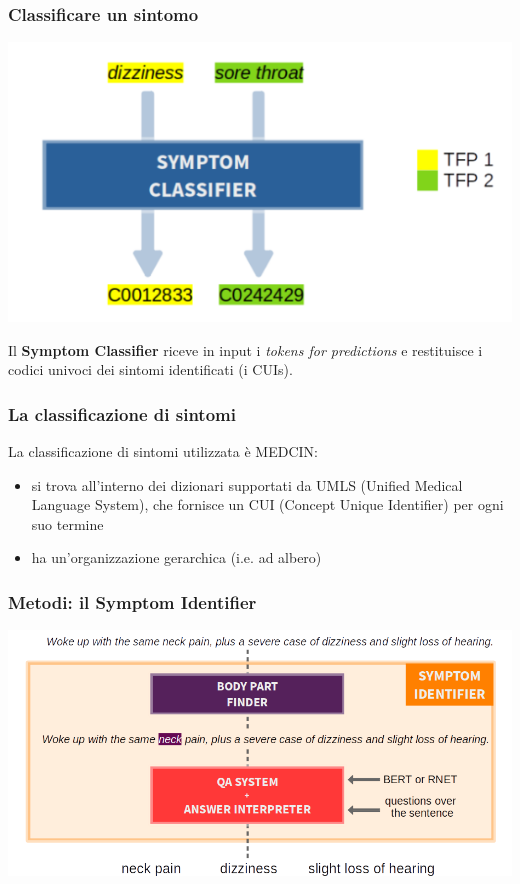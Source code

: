 \documentclass{beamer}
\begin{document}
\begin{frame}
\frametitle{Classificare un sintomo}

\includegraphics[width=\textwidth]{images/symptom_classifier1.png}

Il \textbf{Symptom Classifier} riceve in input i \emph{tokens for predictions} e restituisce i codici univoci dei sintomi identificati (i CUIs).

\end{frame}

\begin{frame}
\frametitle{La classificazione di sintomi}

La classificazione di sintomi utilizzata è MEDCIN:
\begin{itemize}
  \item si trova all'interno dei dizionari supportati da UMLS (Unified Medical Language System), che fornisce un CUI (Concept Unique Identifier) per ogni suo termine
  \item ha un'organizzazione gerarchica (i.e. ad albero)
\end{itemize}


\end{frame}

\begin{frame}
\frametitle{Metodi: il Symptom Identifier}
\includegraphics[width=\textwidth]{images/methods_overview1.png}
\end{frame}
\end{document}
